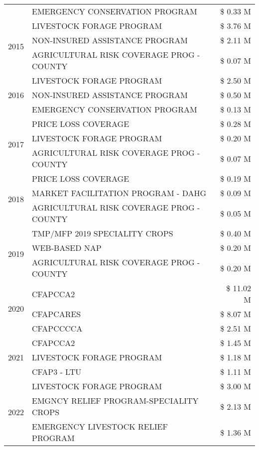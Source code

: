 \begin{tabular}{llr}
 & EMERGENCY CONSERVATION PROGRAM & \$ 0.33 M \\
\cline{1-3}
\multirow[t]{3}{*}{2015} & LIVESTOCK FORAGE PROGRAM & \$ 3.76 M \\
 & NON-INSURED ASSISTANCE PROGRAM & \$ 2.11 M \\
 & AGRICULTURAL RISK COVERAGE PROG - COUNTY & \$ 0.07 M \\
\cline{1-3}
\multirow[t]{3}{*}{2016} & LIVESTOCK FORAGE PROGRAM & \$ 2.50 M \\
 & NON-INSURED ASSISTANCE PROGRAM & \$ 0.50 M \\
 & EMERGENCY CONSERVATION PROGRAM & \$ 0.13 M \\
\cline{1-3}
\multirow[t]{3}{*}{2017} & PRICE LOSS COVERAGE & \$ 0.28 M \\
 & LIVESTOCK FORAGE PROGRAM & \$ 0.20 M \\
 & AGRICULTURAL RISK COVERAGE PROG - COUNTY & \$ 0.07 M \\
\cline{1-3}
\multirow[t]{3}{*}{2018} & PRICE LOSS COVERAGE & \$ 0.19 M \\
 & MARKET FACILITATION PROGRAM - DAHG & \$ 0.09 M \\
 & AGRICULTURAL RISK COVERAGE PROG - COUNTY & \$ 0.05 M \\
\cline{1-3}
\multirow[t]{3}{*}{2019} & TMP/MFP 2019 SPECIALITY CROPS & \$ 0.40 M \\
 & WEB-BASED NAP & \$ 0.20 M \\
 & AGRICULTURAL RISK COVERAGE PROG - COUNTY & \$ 0.20 M \\
\cline{1-3}
\multirow[t]{3}{*}{2020} & CFAPCCA2 & \$ 11.02 M \\
 & CFAPCARES & \$ 8.07 M \\
 & CFAPCCCCA & \$ 2.51 M \\
\cline{1-3}
\multirow[t]{3}{*}{2021} & CFAPCCA2 & \$ 1.45 M \\
 & LIVESTOCK FORAGE PROGRAM & \$ 1.18 M \\
 & CFAP3 - LTU & \$ 1.11 M \\
\cline{1-3}
\multirow[t]{3}{*}{2022} & LIVESTOCK FORAGE PROGRAM & \$ 3.00 M \\
 & EMGNCY RELIEF PROGRAM-SPECIALITY CROPS & \$ 2.13 M \\
 & EMERGENCY LIVESTOCK RELIEF PROGRAM & \$ 1.36 M \\
\cline{1-3}
\bottomrule
\end{tabular}
